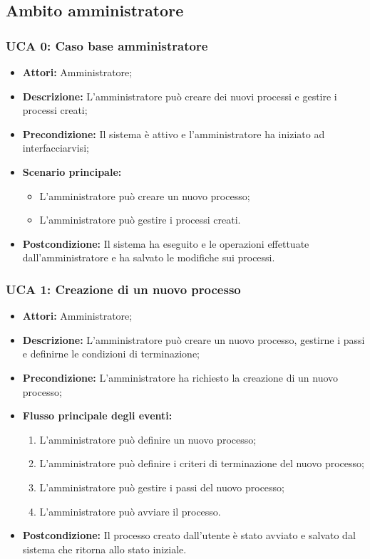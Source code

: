 \subsection{Ambito amministratore}

\subsubsection{UCA 0: Caso base amministratore}
\begin{itemize}
\item \textbf{Attori:} Amministratore;
\item \textbf{Descrizione:} L'amministratore può creare dei nuovi processi e gestire i processi creati;
\item \textbf{Precondizione:} Il sistema è attivo e l'amministratore ha iniziato ad interfacciarvisi;
\item \textbf{Scenario principale:} 
\begin{itemize}
\item L'amministratore può creare un nuovo processo;
\item L'amministratore può gestire i processi creati.
\end{itemize}
\item \textbf{Postcondizione:} Il sistema ha eseguito e le operazioni effettuate dall'amministratore e ha salvato le modifiche sui processi.
\end{itemize}

\subsubsection{UCA 1: Creazione di un nuovo processo}
\begin{itemize}
\item \textbf{Attori:}
 Amministratore;
\item \textbf{Descrizione:} 
L'amministratore può creare un nuovo processo, gestirne i passi e definirne le condizioni di terminazione;
\item \textbf{Precondizione:} L'amministratore ha richiesto la creazione di un nuovo processo;
\item \textbf{Flusso principale degli eventi:} 
\begin{enumerate}
\item L'amministratore può definire un nuovo processo;
\item L'amministratore può definire i criteri di terminazione del nuovo processo;
\item L'amministratore può gestire i passi del nuovo processo;
\item L'amministratore può avviare il processo.
\end{enumerate}
\item \textbf{Postcondizione:} 
Il processo creato dall'utente è stato avviato e salvato dal sistema che ritorna allo stato iniziale.
\end{itemize}

